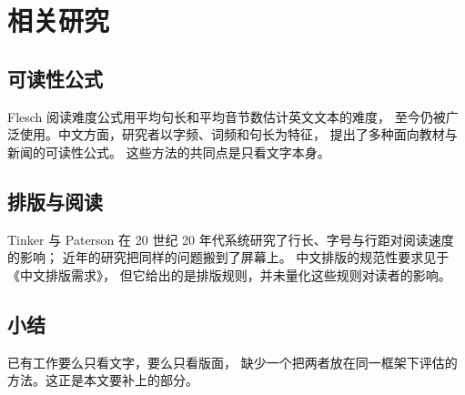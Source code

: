 \chapter{相关研究}
\label{chap:related}

\section{可读性公式}

Flesch 阅读难度公式\cite{flesch1948}用平均句长和平均音节数估计英文文本的难度，
至今仍被广泛使用。中文方面，研究者以字频、词频和句长为特征，
提出了多种面向教材与新闻的可读性公式\cite{wang2020}。
这些方法的共同点是只看文字本身。

\section{排版与阅读}

Tinker 与 Paterson 在 20 世纪 20 年代系统研究了行长、字号与行距对阅读速度的影响\cite{tinker1929}；
近年的研究把同样的问题搬到了屏幕上\cite{dyson2004}。
中文排版的规范性要求见于《中文排版需求》\cite{w3c2020clreq}，
但它给出的是排版规则，并未量化这些规则对读者的影响。

\section{小结}

已有工作要么只看文字，要么只看版面，
缺少一个把两者放在同一框架下评估的方法。这正是本文要补上的部分。
